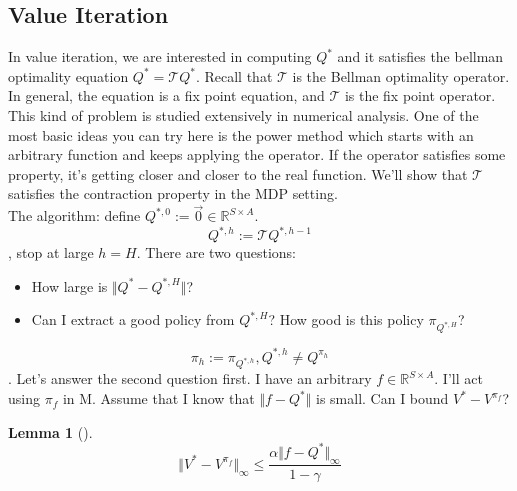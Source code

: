 \documentclass{report}
\newtheorem{lemma}[theorem]{Lemma}
\begin{document}
\subsection{Value Iteration}
In value iteration, we are interested in computing $Q^*$ and it satisfies the bellman optimality equation $Q^*=\mathcal{T}Q^*$. Recall that $\mathcal{T}$ is the Bellman optimality operator. In general, the equation is a fix point equation, and $\mathcal{T}$ is the fix point operator. This kind of problem is studied extensively in numerical analysis. One of the most  basic ideas you can try here is the power method which starts with an arbitrary function and keeps applying the operator. If the operator satisfies some property, it's getting closer and closer to the real function. We'll show that $\mathcal{T}$ satisfies the contraction property in the MDP setting.\\
The algorithm: define $Q^{*,0}:=\Vec{0}\in \mathbb{R}^{S\times A}$. \[Q^{*,h}:=\mathcal{T}Q^{*,h-1}\], stop at large $h=H$. There are two questions:
\begin{itemize}
    \item How large is $\Vert Q^*-Q^{*, H}\Vert$?
    \item Can I extract a good policy from $Q^{*, H}$? How good is this policy $\pi_{Q^{*, H}}$?
\end{itemize}
\[\pi_h := \pi_{Q^{*,h}}, Q^{*,h} \neq Q^{\pi_h}\].
Let's answer the second question first. I have an arbitrary $f\in \mathbb{R}^{S\times A}$. I'll act using $\pi_f$ in M. Assume that I know that $\Vert f-Q^*\Vert$ is small. Can I bound $V^{*}-V^{\pi_f}$?
\begin{lemma}[\cite{Singh1994AnFunctions}]
    \[\Vert  V^*-V^{ \pi_f} \Vert_{\infty} \leq \frac{\alpha \Vert f-Q^{*}\Vert_{\infty}}{1-\gamma}\]
\end{lemma}
\end{document}
